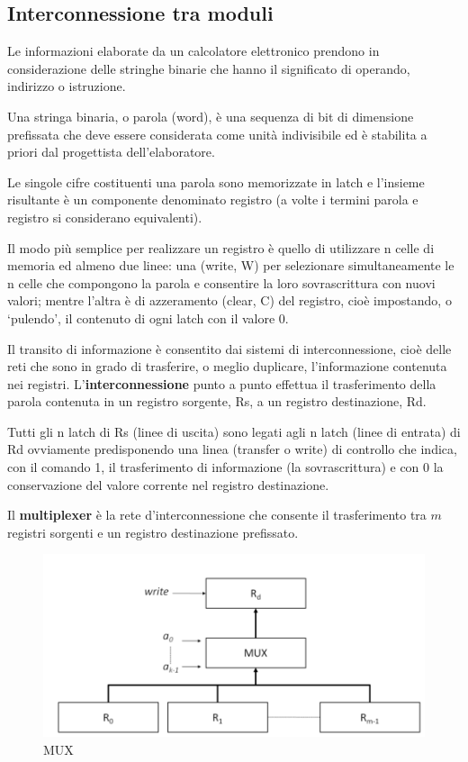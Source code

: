 \documentclass[12pt]{article} %
\begin{document}
\subsection{Interconnessione tra moduli}
Le informazioni elaborate da un calcolatore elettronico prendono in considerazione delle stringhe binarie che hanno il significato di operando, indirizzo o istruzione.\par\medskip\noindent
Una stringa binaria, o parola (word), è una sequenza di bit di dimensione prefissata che deve essere considerata come unità indivisibile ed è stabilita a priori dal progettista dell’elaboratore. \par\medskip\noindent
Le singole cifre costituenti una parola sono memorizzate in latch e l’insieme risultante è un componente denominato registro (a volte i termini parola e registro si considerano equivalenti).\par\medskip\noindent
Il modo più semplice per realizzare un registro è quello di utilizzare n celle di memoria ed almeno due linee: una (write, W) per selezionare simultaneamente le n celle che compongono la parola e consentire la loro sovrascrittura con nuovi valori; mentre l’altra è di azzeramento (clear, C) del registro, cioè impostando, o ‘pulendo’, il contenuto di ogni latch con il valore 0. \par\medskip\noindent
Il transito di informazione è consentito dai sistemi di interconnessione, cioè delle reti che sono in
grado di trasferire, o meglio duplicare, l’informazione contenuta nei registri.
L’\textbf{interconnessione} punto a punto effettua il trasferimento della parola contenuta in un registro sorgente, Rs, a un registro destinazione, Rd. \par\medskip\noindent
Tutti gli n latch di Rs (linee di uscita) sono legati agli n latch (linee di entrata) di Rd ovviamente predisponendo una linea (transfer o write) di controllo che indica, con il comando 1, il trasferimento di informazione (la sovrascrittura) e con 0 la conservazione del valore corrente nel registro destinazione. \par\medskip\noindent
Il \textbf{multiplexer} è la rete d’interconnessione che consente il trasferimento tra \(m\) registri sorgenti e un registro destinazione prefissato.
\begin{figure}[h]
    \centering
    \includegraphics[width=0.50\linewidth]{mux.png}
    \caption{MUX}
\end{figure}
\end{document}
